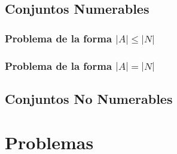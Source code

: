 \documentclass[letterpaper,11pt]{article}
\theoremstyle{plain}
\begin{document}
\subsection{Conjuntos Numerables}
\subsubsection{Problema de la forma \texorpdfstring{$|A|\leq |N|$}{Lg} }
\subsubsection{Problema de la forma \texorpdfstring{$|A| = |N|$}{Lg} }
\subsection{Conjuntos No Numerables}


\newpage 
\section{Problemas}\label{sec:problemas}
\end{document}
